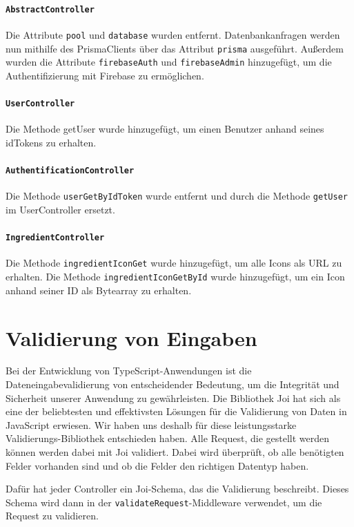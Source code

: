 \documentclass{implementierungsheft}
\begin{document}
\paragraph{\texttt{AbstractController}} Die Attribute \texttt{pool} und \texttt{database} wurden entfernt. Datenbankanfragen werden nun mithilfe des PrismaClients über das Attribut \texttt{prisma} ausgeführt. 
Außerdem wurden die Attribute \texttt{firebaseAuth} und \texttt{firebaseAdmin} hinzugefügt, um die Authentifizierung mit Firebase zu ermöglichen.

\paragraph{\texttt{UserController}} Die Methode getUser wurde hinzugefügt, um einen Benutzer anhand seines idTokens zu erhalten.

\paragraph{\texttt{AuthentificationController}} Die Methode \texttt{userGetByIdToken} wurde entfernt und durch die Methode \texttt{getUser} im UserController ersetzt.

\paragraph{\texttt{IngredientController}} Die Methode \texttt{ingredientIconGet} wurde hinzugefügt, um alle Icons als URL zu erhalten. Die Methode \texttt{ingredientIconGetById} wurde hinzugefügt, um ein Icon anhand seiner ID als Bytearray zu erhalten.

\section{Validierung von Eingaben}
Bei der Entwicklung von TypeScript-Anwendungen ist die Dateneingabevalidierung von entscheidender Bedeutung, um die Integrität und Sicherheit unserer Anwendung zu gewährleisten. Die Bibliothek Joi hat sich als eine der beliebtesten und effektivsten Lösungen für die Validierung von Daten in JavaScript erwiesen. Wir haben uns deshalb für diese leistungsstarke Validierungs-Bibliothek entschieden haben.
Alle Request, die gestellt werden können werden dabei mit Joi validiert. Dabei wird überprüft, ob alle benötigten Felder vorhanden sind und ob die Felder den richtigen Datentyp haben.

Dafür hat jeder Controller ein Joi-Schema, das die Validierung beschreibt. Dieses Schema wird dann in der \texttt{validateRequest}-Middleware verwendet, um die Request zu validieren.
\end{document}
